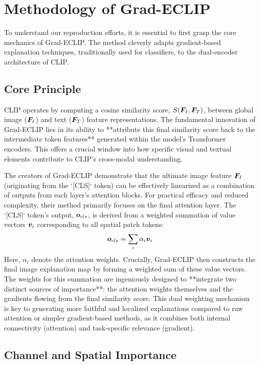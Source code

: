 \documentclass[10pt]{article} %
\begin{document}
\section{Methodology of Grad-ECLIP}
\label{gen_inst}

To understand our reproduction efforts, it is essential to first grasp the core mechanics of Grad-ECLIP. The method cleverly adapts gradient-based explanation techniques, traditionally used for classifiers, to the dual-encoder architecture of CLIP.

\subsection{Core Principle}

CLIP operates by computing a cosine similarity score, $S({\bm{F}}_I, {\bm{F}}_T)$, between global image (${\bm{F}}_I$) and text (${\bm{F}}_T$) feature representations. The fundamental innovation of Grad-ECLIP lies in its ability to **attribute this final similarity score back to the intermediate token features** generated within the model's Transformer encoders. This offers a crucial window into how specific visual and textual elements contribute to CLIP's cross-modal understanding.

The creators of Grad-ECLIP demonstrate that the ultimate image feature ${\bm{F}}_I$ (originating from the `[CLS]` token) can be effectively linearized as a combination of outputs from each layer's attention blocks. For practical efficacy and reduced complexity, their method primarily focuses on the final attention layer. The `[CLS]` token's output, ${\bm{o}}_{cls}$, is derived from a weighted summation of value vectors ${\bm{v}}_i$ corresponding to all spatial patch tokens:
\begin{equation}
{\bm{o}}_{cls} = \sum_{i} \alpha_i {\bm{v}}_i
\end{equation}
Here, $\alpha_i$ denote the attention weights. Crucially, Grad-ECLIP then constructs the final image explanation map by forming a weighted sum of these value vectors. The weights for this summation are ingeniously designed to **integrate two distinct sources of importance**: the attention weights themselves and the gradients flowing from the final similarity score. This dual weighting mechanism is key to generating more faithful and localized explanations compared to raw attention or simpler gradient-based methods, as it combines both internal connectivity (attention) and task-specific relevance (gradient).

\subsection{Channel and Spatial Importance}
\end{document}
